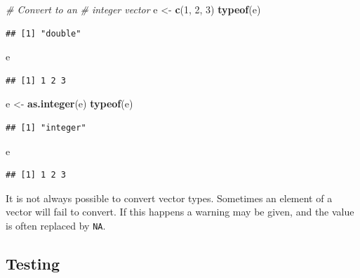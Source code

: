 \documentclass[
]{book}
\newenvironment{Shaded}{\begin{snugshade}}{\end{snugshade}}
\newcommand{\CommentTok}[1]{\textcolor[rgb]{0.56,0.35,0.01}{\textit{#1}}}
\newcommand{\DecValTok}[1]{\textcolor[rgb]{0.00,0.00,0.81}{#1}}
\newcommand{\KeywordTok}[1]{\textcolor[rgb]{0.13,0.29,0.53}{\textbf{#1}}}
\newcommand{\NormalTok}[1]{#1}
\newcommand{\StringTok}[1]{\textcolor[rgb]{0.31,0.60,0.02}{#1}}
\begin{document}
\begin{Shaded}
\begin{Highlighting}[]
\CommentTok{# Convert to an}
\CommentTok{# integer vector}
\NormalTok{e <-}\StringTok{ }\KeywordTok{c}\NormalTok{(}\DecValTok{1}\NormalTok{, }\DecValTok{2}\NormalTok{, }\DecValTok{3}\NormalTok{)}
\KeywordTok{typeof}\NormalTok{(e)}
\end{Highlighting}
\end{Shaded}

\begin{verbatim}
## [1] "double"
\end{verbatim}

\begin{Shaded}
\begin{Highlighting}[]
\NormalTok{e}
\end{Highlighting}
\end{Shaded}

\begin{verbatim}
## [1] 1 2 3
\end{verbatim}

\begin{Shaded}
\begin{Highlighting}[]
\NormalTok{e <-}\StringTok{ }\KeywordTok{as.integer}\NormalTok{(e)}
\KeywordTok{typeof}\NormalTok{(e)}
\end{Highlighting}
\end{Shaded}

\begin{verbatim}
## [1] "integer"
\end{verbatim}

\begin{Shaded}
\begin{Highlighting}[]
\NormalTok{e}
\end{Highlighting}
\end{Shaded}

\begin{verbatim}
## [1] 1 2 3
\end{verbatim}

It is not always possible to convert vector types. Sometimes an element of a vector will fail to convert. If this happens a warning may be given, and the value is often replaced by \texttt{NA}.

\hypertarget{testing}{%
\subsection{Testing}\label{testing}}
\end{document}
